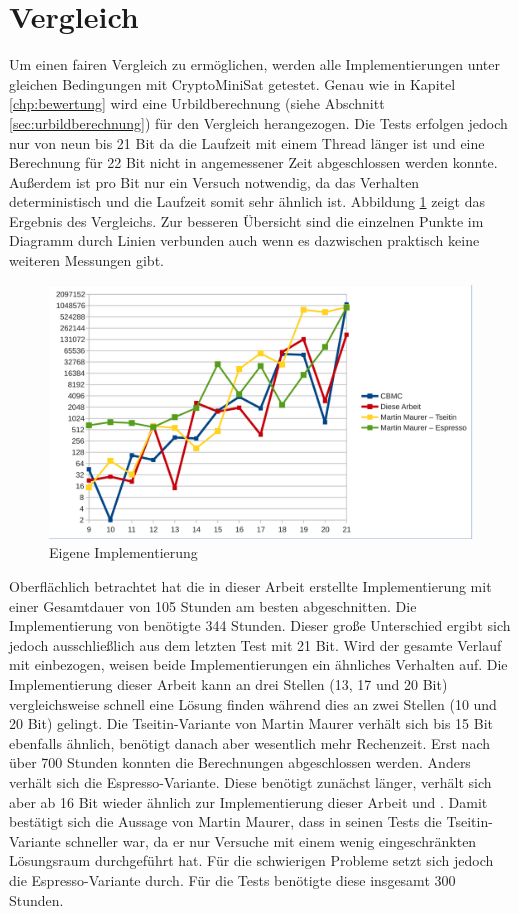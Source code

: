 \section{Vergleich}
\label{sec:vergleich}

Um einen fairen Vergleich zu ermöglichen, werden alle Implementierungen unter gleichen Bedingungen mit CryptoMiniSat
getestet. Genau wie in Kapitel \ref{chp:bewertung} wird eine Urbildberechnung (siehe Abschnitt \ref{sec:urbildberechnung})
für den Vergleich herangezogen. Die Tests erfolgen jedoch nur von neun bis 21 Bit da die Laufzeit mit einem Thread länger
ist und eine Berechnung für 22 Bit nicht in angemessener Zeit abgeschlossen werden konnte. Außerdem ist pro Bit nur ein
Versuch notwendig, da das Verhalten deterministisch und die Laufzeit somit sehr ähnlich ist. Abbildung \ref{fig:eval_final}
zeigt das Ergebnis des Vergleichs. Zur besseren Übersicht sind die einzelnen Punkte im Diagramm durch Linien verbunden auch
wenn es dazwischen praktisch keine weiteren Messungen gibt.
\begin{figure}[!h]
  \centering
  \includegraphics[scale=0.55]{images/eval_final}
  \caption{Eigene Implementierung}
  \label{fig:eval_final}
\end{figure}

Oberflächlich betrachtet hat die in dieser Arbeit erstellte Implementierung mit einer Gesamtdauer von 105 Stunden am besten abgeschnitten.
Die Implementierung von  benötigte 344 Stunden. Dieser große Unterschied ergibt sich jedoch ausschließlich aus dem
letzten Test mit 21 Bit. Wird der gesamte Verlauf mit einbezogen, weisen beide Implementierungen ein ähnliches Verhalten auf. Die
Implementierung dieser Arbeit kann an drei Stellen (13, 17 und 20 Bit) vergleichsweise schnell eine Lösung finden während  dies
an zwei Stellen (10 und 20 Bit) gelingt. Die Tseitin-Variante von Martin Maurer verhält sich bis 15 Bit ebenfalls ähnlich, benötigt danach
aber wesentlich mehr Rechenzeit. Erst nach über 700 Stunden konnten die Berechnungen abgeschlossen werden.
Anders verhält sich die Espresso-Variante. Diese benötigt zunächst länger, verhält sich aber ab 16 Bit wieder ähnlich
zur Implementierung dieser Arbeit und . Damit bestätigt sich die Aussage von Martin Maurer, dass in seinen Tests die Tseitin-Variante
schneller war, da er nur Versuche mit einem wenig eingeschränkten Lösungsraum durchgeführt hat. Für die schwierigen Probleme
setzt sich jedoch die Espresso-Variante durch. Für die Tests benötigte diese insgesamt 300 Stunden.